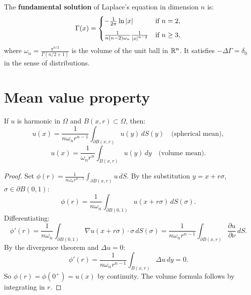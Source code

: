 \begin{theorem}
The \textbf{fundamental solution} of Laplace's equation in dimension $n$ is:
\begin{equation}\label{eq:fundamental_laplace}
    \Gamma(x) = \begin{cases}
        -\frac{1}{2\pi}\ln\left| x \right| & \text{if } n = 2,\\[6pt]
        \frac{1}{n(n-2)\omega_n}\frac{1}{\left| x \right|^{n-2}} & \text{if } n \geq 3,
    \end{cases}
\end{equation}
where $\omega_n = \frac{\pi^{n/2}}{\Gamma(n/2+1)}$ is the volume of the
unit ball in $\mathbb{R}^n$. It satisfies $-\Delta\Gamma = \delta_0$ in the sense
of distributions.
\end{theorem}

\section{Mean value property}

\begin{theorem}
If $u$ is harmonic in $\Omega$ and $B(x,r) \subset \Omega$, then:
\begin{equation}\label{eq:mean_value_sphere}
    u(x) = \frac{1}{n\omega_n r^{n-1}}\int_{\partial B(x,r)} u(y)\, dS(y)
    \quad \text{(spherical mean)},
\end{equation}
\begin{equation}\label{eq:mean_value_ball}
    u(x) = \frac{1}{\omega_n r^n}\int_{B(x,r)} u(y)\, dy
    \quad \text{(volume mean)}.
\end{equation}
\end{theorem}

\begin{proof}
Set $\phi(r) = \frac{1}{n\omega_n r^{n-1}}\int_{\partial B(x,r)} u\, dS$.
By the substitution $y = x + r\sigma$, $\sigma \in \partial B(0,1)$:
\[
    \phi(r) = \frac{1}{n\omega_n}\int_{\partial B(0,1)} u(x+r\sigma)\, dS(\sigma).
\]
Differentiating:
\[
    \phi'(r) = \frac{1}{n\omega_n}\int_{\partial B(0,1)}
    \nabla u(x+r\sigma) \cdot \sigma\, dS(\sigma)
    = \frac{1}{n\omega_n r^{n-1}}\int_{\partial B(x,r)}
    \frac{\partial u}{\partial \nu}\, dS.
\]
By the divergence theorem and $\Delta u = 0$:
\[
    \phi'(r) = \frac{1}{n\omega_n r^{n-1}}\int_{B(x,r)} \Delta u\, dy = 0.
\]
So $\phi(r) = \phi(0^+) = u(x)$ by continuity. The volume formula
follows by integrating in $r$.
\end{proof}

